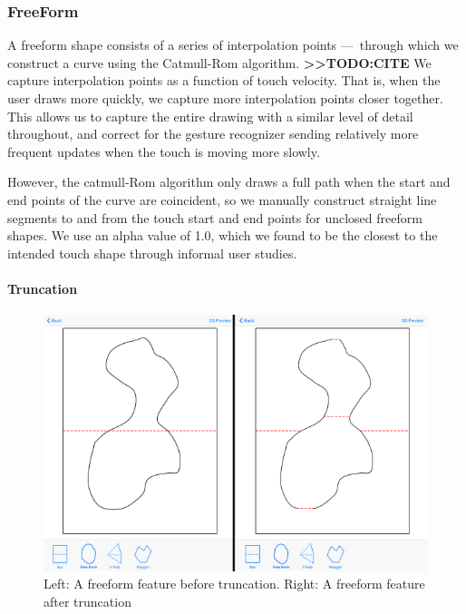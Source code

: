 \subsubsection{FreeForm}\label{freeform}

A freeform shape consists of a series of interpolation points
---~through which we construct a curve using the Catmull-Rom algorithm.
\textbf{\textgreater{}\textgreater{}TODO:CITE} We capture interpolation
points as a function of touch velocity. That is, when the user draws
more quickly, we capture more interpolation points closer together. This
allows us to capture the entire drawing with a similar level of detail
throughout, and correct for the gesture recognizer sending relatively
more frequent updates when the touch is moving more slowly.

However, the catmull-Rom algorithm only draws a full path when the start
and end points of the curve are coincident, so we manually construct
straight line segments to and from the touch start and end points for
unclosed freeform shapes. We use an alpha value of 1.0, which we found
to be the closest to the intended touch shape through informal user
studies.

\paragraph{Truncation}\label{truncation}

\begin{figure}[htbp]
\centering
\includegraphics{figures/41_Tech_Tool_Implementation/truncationBeforeAfter.pdf}
\caption{Left: A freeform feature before truncation. Right: A freeform
feature after truncation}
\end{figure}

